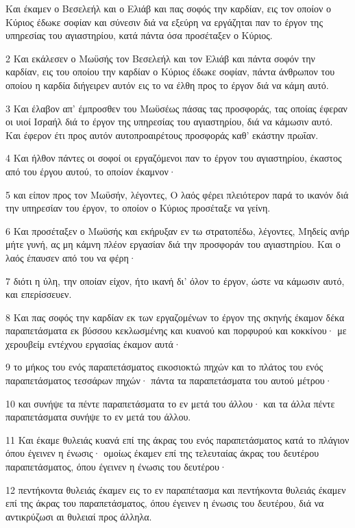 \par Και έκαμεν ο Βεσελεήλ και ο Ελιάβ και πας σοφός την καρδίαν, εις τον οποίον ο Κύριος έδωκε σοφίαν και σύνεσιν διά να εξεύρη να εργάζηται παν το έργον της υπηρεσίας του αγιαστηρίου, κατά πάντα όσα προσέταξεν ο Κύριος.
\par 2 Και εκάλεσεν ο Μωϋσής τον Βεσελεήλ και τον Ελιάβ και πάντα σοφόν την καρδίαν, εις του οποίου την καρδίαν ο Κύριος έδωκε σοφίαν, πάντα άνθρωπον του οποίου η καρδία διήγειρεν αυτόν εις το να έλθη προς το έργον διά να κάμη αυτό.
\par 3 Και έλαβον απ' έμπροσθεν του Μωϋσέως πάσας τας προσφοράς, τας οποίας έφεραν οι υιοί Ισραήλ διά το έργον της υπηρεσίας του αγιαστηρίου, διά να κάμωσιν αυτό. Και έφερον έτι προς αυτόν αυτοπροαιρέτους προσφοράς καθ' εκάστην πρωΐαν.
\par 4 Και ήλθον πάντες οι σοφοί οι εργαζόμενοι παν το έργον του αγιαστηρίου, έκαστος από του έργου αυτού, το οποίον έκαμνον·
\par 5 και είπον προς τον Μωϋσήν, λέγοντες, Ο λαός φέρει πλειότερον παρά το ικανόν διά την υπηρεσίαν του έργον, το οποίον ο Κύριος προσέταξε να γείνη.
\par 6 Και προσέταξεν ο Μωϋσής και εκήρυξαν εν τω στρατοπέδω, λέγοντες, Μηδείς ανήρ μήτε γυνή, ας μη κάμνη πλέον εργασίαν διά την προσφοράν του αγιαστηρίου. Και ο λαός έπαυσεν από του να φέρη·
\par 7 διότι η ύλη, την οποίαν είχον, ήτο ικανή δι' όλον το έργον, ώστε να κάμωσιν αυτό, και επερίσσευεν.
\par 8 Και πας σοφός την καρδίαν εκ των εργαζομένων το έργον της σκηνής έκαμον δέκα παραπετάσματα εκ βύσσου κεκλωσμένης και κυανού και πορφυρού και κοκκίνου· με χερουβείμ εντέχνου εργασίας έκαμον αυτά·
\par 9 το μήκος του ενός παραπετάσματος εικοσιοκτώ πηχών και το πλάτος του ενός παραπετάσματος τεσσάρων πηχών· πάντα τα παραπετάσματα του αυτού μέτρου·
\par 10 και συνήψε τα πέντε παραπετάσματα το εν μετά του άλλου· και τα άλλα πέντε παραπετάσματα συνήψε το εν μετά του άλλου.
\par 11 Και έκαμε θυλειάς κυανά επί της άκρας του ενός παραπετάσματος κατά το πλάγιον όπου έγεινεν η ένωσις· ομοίως έκαμεν επί της τελευταίας άκρας του δευτέρου παραπετάσματος, όπου έγεινεν η ένωσις του δευτέρου·
\par 12 πεντήκοντα θυλειάς έκαμεν εις το εν παραπέτασμα και πεντήκοντα θυλειάς έκαμεν επί της άκρας του παραπετάσματος, όπου έγεινεν η ένωσις του δευτέρου, διά να αντικρύζωσι αι θυλειαί προς άλληλα.
